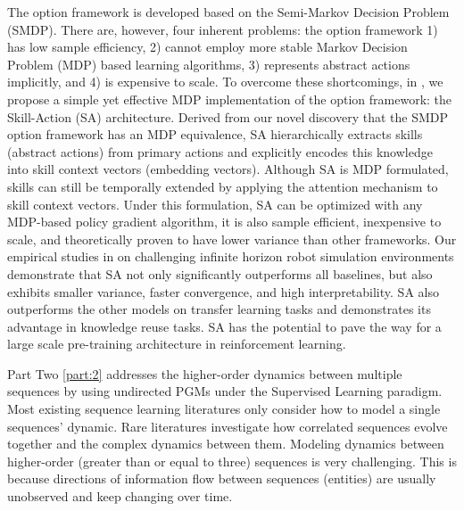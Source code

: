 The option framework is developed based on the Semi-Markov
Decision Problem (SMDP). There are, however, four inherent
problems: the option framework 1) has low sample efficiency, 2)
cannot employ more stable Markov Decision Problem (MDP) based
learning algorithms, 3) represents abstract actions implicitly,
and 4) is expensive to scale. To overcome these shortcomings, in
, we propose a simple yet effective MDP
implementation of the option framework: the Skill-Action (SA)
architecture. Derived from our novel discovery that the SMDP
option framework has an MDP equivalence, SA hierarchically
extracts skills (abstract actions) from primary actions and
explicitly encodes this knowledge into skill context vectors
(embedding vectors). Although SA is MDP formulated, skills can
still be temporally extended by applying the attention mechanism
to skill context vectors. Under this formulation, SA can be
optimized with any MDP-based policy gradient algorithm, it is
also sample efficient, inexpensive to scale, and theoretically
proven to have lower variance than other frameworks. Our
empirical studies in  on challenging infinite
horizon robot simulation environments demonstrate that SA not
only significantly outperforms all baselines, but also exhibits
smaller variance, faster convergence, and high interpretability.
SA also outperforms the other models on transfer learning tasks
and demonstrates its advantage in knowledge reuse tasks. SA has
the potential to pave the way for a large scale pre-training
architecture in reinforcement learning.

Part Two \ref{part:2} addresses the higher-order dynamics between
multiple sequences by using undirected PGMs under the Supervised
Learning paradigm. Most existing sequence learning literatures
\cite{sargent1993bounded,jegadeesh1993returns,shiller1980stock,
  carhart1997persistence,lux2007forecasting,lux2008markov,abry2019shuffling}
only consider how to model a single sequences' dynamic. Rare
literatures investigate how correlated sequences evolve together
and the complex dynamics between them. Modeling dynamics between
higher-order (greater than or equal to three) sequences is very
challenging. This is because directions of information flow
between sequences (entities) are usually unobserved and keep
changing over time.

